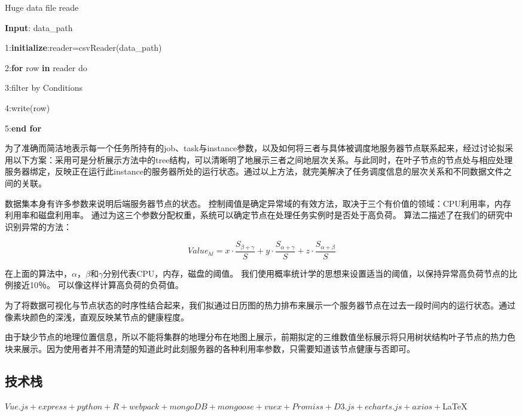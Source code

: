 \begin{algorithm}
	\caption{Huge data file reade}
	\label{alg-1} 
	\textbf{Input}: data\_path
	
	1:\textbf{initialize}:reader=csvReader(data\_path)
	
	2:\textbf{for} row  \textbf{in} reader do
	
	3:\qquad filter by Conditions
	
	4:\qquad write(row)
	
	5:\textbf{end for}

\end{algorithm}


为了准确而简洁地表示每一个任务所持有的job、task与instance参数，以及如何将三者与具体被调度地服务器节点联系起来，经过讨论拟采用以下方案：采用可是分析展示方法中的tree结构，可以清晰明了地展示三者之间地层次关系。与此同时，在叶子节点的节点处与相应处理服务器绑定，反映正在运行此instance的服务器所处的运行状态。通过以上方法，就完美解决了任务调度信息的层次关系和不同数据文件之间的关联。


数据集本身有许多参数来说明后端服务器节点的状态。 控制阈值是确定异常域的有效方法，取决于三个有价值的领域：CPU利用率，内存利用率和磁盘利用率。 通过为这三个参数分配权重，系统可以确定节点在处理任务实例时是否处于高负荷。 算法二描述了在我们的研究中识别异常的方法：

$$Value_{hl}=x\cdot\frac{S_{\beta +\gamma}}{S}+y\cdot\frac{S_{\alpha+\gamma}}{S}+z\cdot\frac{S_{\alpha+\beta}}{S}$$

在上面的算法中，$\alpha$，$\beta$和$\gamma$分别代表CPU，内存，磁盘的阈值。 我们使用概率统计学的思想来设置适当的阈值，以保持异常高负荷节点的比例接近10％。 可以像这样计算高负荷的负荷值。


为了将数据可视化与节点状态的时序性结合起来，我们拟通过日历图的热力排布来展示一个服务器节点在过去一段时间内的运行状态。通过像素块颜色的深浅，直观反映某节点的健康程度。

由于缺少节点的地理位置信息，所以不能将集群的地理分布在地图上展示，前期拟定的三维数值坐标展示将只用树状结构叶子节点的热力色块来展示。因为使用者并不用清楚的知道此时此刻服务器的各种利用率参数，只需要知道该节点健康与否即可。

\subsection{技术栈}
$Vue.js+express+python+R+webpack+mongoDB+mongoose+vuex+Promiss+D3.js+
echarts.js+axios+$\LaTeX$ $


